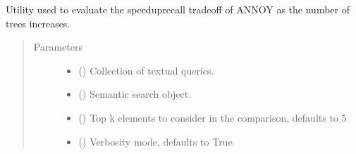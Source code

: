 \documentclass[letterpaper,10pt,english]{sphinxmanual}
\begin{document}
\begin{fulllineitems}
\label{\detokenize{code:experiment_annoy_ntrees.evaluate_n_trees}}
Utility used to evaluate the speedup\sphinxhyphen{}recall tradeoff of ANNOY as
the number of trees increases.
\begin{quote}\begin{description}
\item[{Parameters}] \leavevmode\begin{itemize}
\item {} 
 () \textendash{} Collection of textual queries.

\item {} 
 ({\hyperref[\detokenize{code:semantic_search.SemanticSearch}]{}}) \textendash{} Semantic search object.

\item {} 
 (\sphinxstyleliteralemphasis{\sphinxupquote{, }}) \textendash{} Top k elements to consider in the comparison, defaults to 5

\item {} 
 (\sphinxstyleliteralemphasis{\sphinxupquote{, }}) \textendash{} Verbosity mode, defaults to True

\end{itemize}

\end{description}\end{quote}

\end{fulllineitems}
\end{document}
